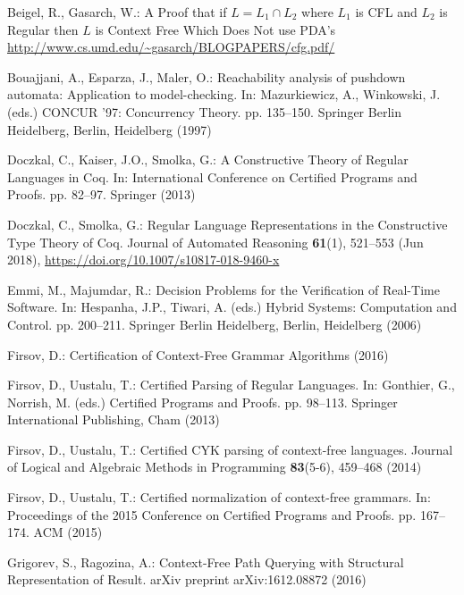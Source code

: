 \documentclass[runningheads]{llncs}
\begin{document}
\begin{thebibliography}{10}
 Beigel, R., Gasarch, W.: {A Proof that if $L = L_1 \cap L_2$ where $L_1$ is
   {CFL} and $L_2$ is Regular then $L$ is Context Free Which Does Not use
   PDA’s} \url{http://www.cs.umd.edu/~gasarch/BLOGPAPERS/cfg.pdf/}

 Bouajjani, A., Esparza, J., Maler, O.: {Reachability analysis of pushdown
   automata: Application to model-checking}. In: Mazurkiewicz, A., Winkowski, J.
   (eds.) CONCUR '97: Concurrency Theory. pp. 135--150. Springer Berlin
   Heidelberg, Berlin, Heidelberg (1997)

 Doczkal, C., Kaiser, J.O., Smolka, G.: {A Constructive Theory of Regular
   Languages in Coq}. In: {International Conference on Certified Programs and
   Proofs}. pp. 82--97. Springer (2013)

 Doczkal, C., Smolka, G.: {Regular Language Representations in the Constructive
   Type Theory of Coq}. Journal of Automated Reasoning  \textbf{61}(1),
   521--553 (Jun 2018), \url{https://doi.org/10.1007/s10817-018-9460-x}

 Emmi, M., Majumdar, R.: {Decision Problems for the Verification of Real-Time
   Software}. In: Hespanha, J.P., Tiwari, A. (eds.) Hybrid Systems: Computation
   and Control. pp. 200--211. Springer Berlin Heidelberg, Berlin, Heidelberg
   (2006)

 Firsov, D.: {Certification of Context-Free Grammar Algorithms}  (2016)

 Firsov, D., Uustalu, T.: {Certified Parsing of Regular Languages}. In:
   Gonthier, G., Norrish, M. (eds.) {Certified Programs and Proofs}. pp.
   98--113. Springer International Publishing, Cham (2013)

 Firsov, D., Uustalu, T.: {Certified CYK parsing of context-free languages}.
   Journal of Logical and Algebraic Methods in Programming  \textbf{83}(5-6),
   459--468 (2014)

 Firsov, D., Uustalu, T.: {Certified normalization of context-free grammars}.
   In: Proceedings of the 2015 Conference on Certified Programs and Proofs. pp.
   167--174. ACM (2015)

 Grigorev, S., Ragozina, A.: {Context-Free Path Querying with Structural
   Representation of Result}. arXiv preprint arXiv:1612.08872  (2016)


\end{thebibliography}
\end{document}
